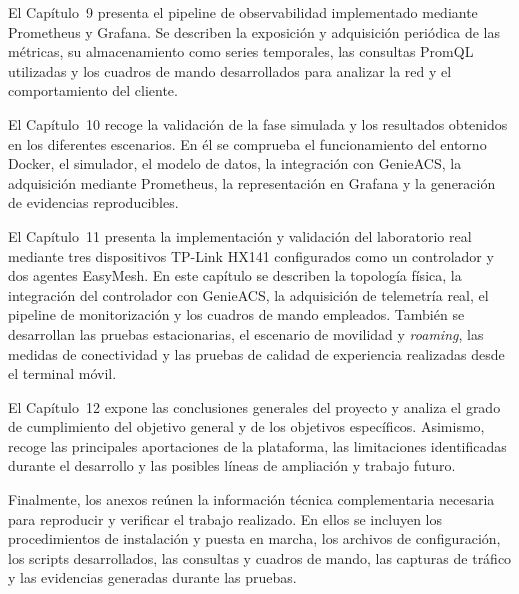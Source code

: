 El Capítulo~9 presenta el pipeline de observabilidad implementado mediante
Prometheus y Grafana. Se describen la exposición y adquisición periódica
de las métricas, su almacenamiento como series temporales, las consultas
PromQL utilizadas y los cuadros de mando desarrollados para analizar la
red y el comportamiento del cliente.

El Capítulo~10 recoge la validación de la fase simulada y los resultados
obtenidos en los diferentes escenarios. En él se comprueba el
funcionamiento del entorno Docker, el simulador, el modelo de datos, la
integración con GenieACS, la adquisición mediante Prometheus, la
representación en Grafana y la generación de evidencias reproducibles.

El Capítulo~11 presenta la implementación y validación del laboratorio
real mediante tres dispositivos TP-Link HX141 configurados como un
controlador y dos agentes EasyMesh. En este capítulo se describen la
topología física, la integración del controlador con GenieACS, la
adquisición de telemetría real, el pipeline de monitorización y los
cuadros de mando empleados. También se desarrollan las pruebas
estacionarias, el escenario de movilidad y \textit{roaming}, las medidas
de conectividad y las pruebas de calidad de experiencia realizadas desde
el terminal móvil.

El Capítulo~12 expone las conclusiones generales del proyecto y analiza
el grado de cumplimiento del objetivo general y de los objetivos
específicos. Asimismo, recoge las principales aportaciones de la
plataforma, las limitaciones identificadas durante el desarrollo y las
posibles líneas de ampliación y trabajo futuro.

Finalmente, los anexos reúnen la información técnica complementaria
necesaria para reproducir y verificar el trabajo realizado. En ellos se
incluyen los procedimientos de instalación y puesta en marcha, los
archivos de configuración, los scripts desarrollados, las consultas y
cuadros de mando, las capturas de tráfico y las evidencias generadas
durante las pruebas.